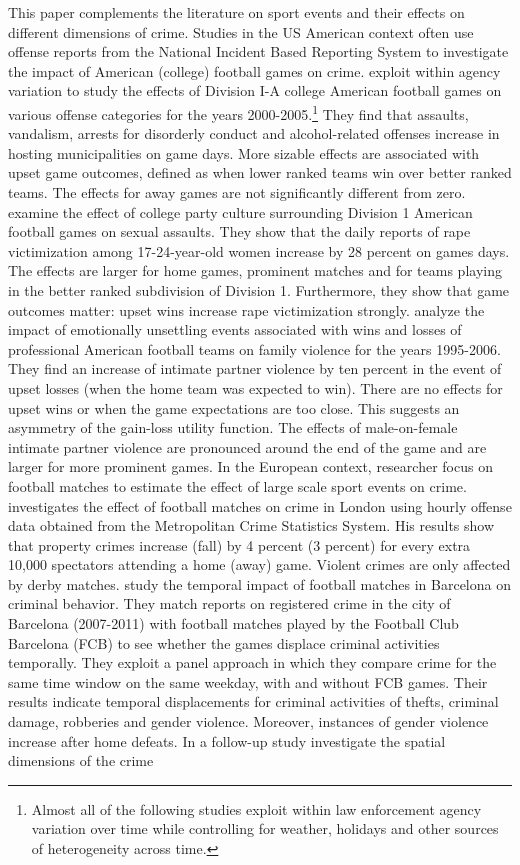 \documentclass[11pt, a4paper]{article} %
\begin{document}
This paper complements the literature on sport events and their effects on different dimensions of crime. Studies in the US American context often use offense reports from the National Incident Based Reporting System to investigate the impact of American (college) football games on crime. \cite{rees2009college} exploit within agency variation to study the effects of Division I-A college American football games on various offense categories for the years 2000-2005.\footnote{Almost all of the following studies exploit within law enforcement agency variation over time while controlling for weather, holidays and other sources of heterogeneity across time.} They find that assaults, vandalism, arrests for disorderly conduct and alcohol-related offenses increase in hosting municipalities on game days. More sizable effects are associated with upset game outcomes, defined as when lower ranked teams win over better ranked teams. The effects for away games are not significantly different from zero. \cite{lindo2018college} examine the effect of college party culture surrounding Division 1 American football games on sexual assaults. They show that the daily reports of rape victimization among 17-24-year-old women increase by 28 percent on games days. The effects are larger for home games, prominent matches and for teams playing in the better ranked subdivision of Division 1. Furthermore, they show that game outcomes matter: upset wins increase rape victimization strongly. \cite{card2011family} analyze the impact of emotionally unsettling events associated with wins and losses of professional American football teams on family violence for the years 1995-2006. They find an increase of intimate partner violence by ten percent in the event of upset losses (when the home team was expected to win). There are no effects for upset wins or when the game expectations are too close. This suggests an asymmetry of the gain-loss utility function. The effects of male-on-female intimate partner violence are pronounced around the end of the game and are larger for more prominent games. In the European context, researcher focus on football matches to estimate the effect of large scale sport events on crime. \cite{marie2016police} investigates the effect of football matches on crime in London using hourly offense data obtained from the Metropolitan Crime Statistics System. His results show that property crimes increase (fall) by 4 percent (3 percent) for every extra 10,000 spectators attending a home (away) game. Violent crimes are only affected by derby matches. \cite{montolio2016time} study the temporal impact of football matches in Barcelona on criminal behavior. They match reports on registered crime in the city of Barcelona (2007-2011) with football matches played by the Football Club Barcelona (FCB) to see whether the games displace criminal activities temporally. They exploit a panel approach in which they compare crime for the same time window on the same weekday, with and without FCB games. Their results indicate temporal displacements for criminal activities of thefts, criminal damage, robberies and gender violence. Moreover, instances of gender violence increase after home defeats. In a follow-up study \cite{montolio2019measuring} investigate the spatial dimensions of the crime 
\end{document}
